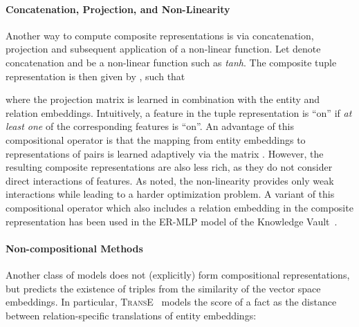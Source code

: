 \documentclass[letterpaper]{article}
\newcommand{\hole}{\textsc{HolE}\xspace}
\newcommand{\transe}{\textsc{TransE}\xspace}
\newcommand{\rescal}{\textsc{Rescal}\xspace}
\begin{document}
\begin{figure*}[tb]
{\begin{minipage}{0.33\textwidth}
{
      }
      \vspace{-1ex}
    \end{minipage}
  }
  \caption{\rescal and \hole as neural networks. \rescal represents
    pairs of entities via  components (middle layer). In contrast, \hole
    requires only  components.\label{fig:nn}}
\end{figure*}

\paragraph{Concatenation, Projection, and Non-Linearity}
Another way to compute composite representations is via concatenation,
projection and subsequent application of a non-linear function. 
Let 
denote concatenation and  be a non-linear function
such as \emph{tanh}. The composite tuple representation is then
given by , such that

where the projection matrix  is learned in
combination with the entity and relation embeddings. Intuitively, a feature in
the tuple representation  is ``on'' if \emph{at least one}
of the corresponding features is ``on''. An advantage of this
compositional operator is that the mapping from entity embeddings to
representations of pairs is learned adaptively via the matrix . 
However, the resulting composite representations
are also less rich, as they do not consider direct interactions of
features. As \citet{socher2013reasoning} noted, the non-linearity
 provides only weak interactions while leading to a harder optimization problem.
A variant of this compositional operator which also includes a relation
embedding in the composite representation has been used in
the ER-MLP model of the Knowledge Vault~\citep{dong2014knowledge}.


\paragraph{Non-compositional Methods}
Another class of models does not (explicitly) form compositional
representations, but predicts the existence of triples from
the similarity of the vector space embeddings. In particular,
\transe~\citep{bordes2013translating} models the score of a fact as
the distance between relation-specific translations of entity embeddings:
\end{document}
